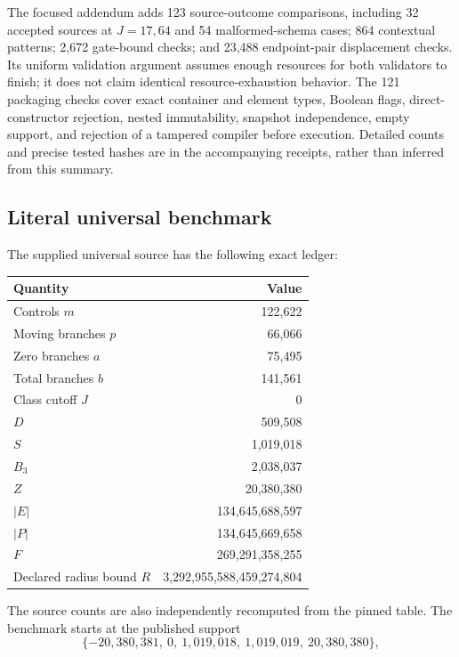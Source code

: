 \documentclass[11pt,a4paper]{article}
\numberwithin{equation}{section}
\begin{document}
The focused addendum adds 123 source-outcome comparisons, including 32 accepted sources at $J=17,64$ and 54 malformed-schema cases; 864 contextual patterns; 2,672 gate-bound checks; and 23,488 endpoint-pair displacement checks. Its uniform validation argument assumes enough resources for both validators to finish; it does not claim identical resource-exhaustion behavior. The 121 packaging checks cover exact container and element types, Boolean flags, direct-constructor rejection, nested immutability, snapshot independence, empty support, and rejection of a tampered compiler before execution. Detailed counts and precise tested hashes are in the accompanying receipts, rather than inferred from this summary.

\subsection{Literal universal benchmark}
The supplied universal source has the following exact ledger:
\begin{center}
\begin{tabular}{@{}lr@{}}
\toprule
Quantity & Value\\
\midrule
Controls $m$ & 122,622\\
Moving branches $p$ & 66,066\\
Zero branches $a$ & 75,495\\
Total branches $b$ & 141,561\\
Class cutoff $J$ & 0\\
$D$ & 509,508\\
$S$ & 1,019,018\\
$B_3$ & 2,038,037\\
$Z$ & 20,380,380\\
$|E|$ & 134,645,688,597\\
$|P|$ & 134,645,669,658\\
$F$ & 269,291,358,255\\
Declared radius bound $R$ & 3,292,955,588,459,274,804\\
\bottomrule
\end{tabular}
\end{center}
The source counts are also independently recomputed from the pinned table. The benchmark starts at the published support
\[
\{-20{,}380{,}381,\ 0,\ 1{,}019{,}018,\ 1{,}019{,}019,\ 20{,}380{,}380\},
\]
\end{document}
